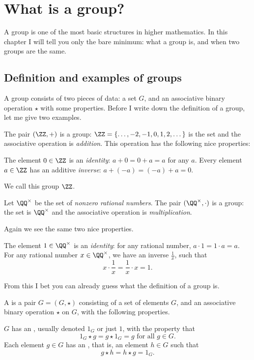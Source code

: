 \chapter{What is a group?}
A group is one of the most basic structures in higher mathematics.
In this chapter I will tell you only the bare minimum:
what a group is, and when two groups are the same.

\section{Definition and examples of groups}

A group consists of two pieces of data: a set $G$, and an associative binary operation $\star$ with some properties.
Before I write down the definition of a group, let me give two examples.

\begin{example}
	The pair $(\ZZ, +)$ is a group:
	$\ZZ = \left\{ \dots,-2,-1,0,1,2,\dots \right\}$ is the set
	and the associative operation is \emph{addition}.
	This operation has the following nice properties:
	\begin{itemize}
		\ii The element $0 \in \ZZ$ is an \emph{identity}:
		$a+0=0+a = a$ for any $a$.
		\ii Every element $a \in \ZZ$ has an additive \emph{inverse}: $a + (-a) = (-a) + a = 0$.
	\end{itemize}
	We call this group $\ZZ$.
\end{example}
\begin{example}
	Let $\QQ^\times$ be the set of \emph{nonzero rational numbers}.
	The pair $(\QQ^\times, \cdot)$ is a group:
	the set is $\QQ^\times$
	and the associative operation is \emph{multiplication}.

	Again we see the same two nice properties.
	\begin{itemize}
		\ii The element $1 \in \QQ^\times$ is an \emph{identity}:
		for any rational number, $a \cdot 1 = 1 \cdot a = a$.
		\ii For any rational number $x \in \QQ^\times$,
		we have an inverse $\frac{1}{x}$, such that
		\[ x \cdot \frac 1x = \frac 1x \cdot x = 1. \]
	\end{itemize}
\end{example}

From this I bet you can already guess what the definition of a group is.
\begin{definition}
	A  is a pair $G = (G, \star)$
	consisting of a set of elements $G$, and an associative
	binary operation $\star$ on $G$, with the following properties.
	\begin{itemize}
		\ii $G$ has an , usually denoted $1_G$
		or just $1$, with the property that
		\[ 1_G \star g = g \star 1_G = g \text{ for all $g \in G$}. \]
		\ii Each element $g \in G$ has an , that is, an element $h \in G$ such that \[ g \star h = h \star g = 1_G. \]
	\end{itemize}
	\label{def:group}
\end{definition}

